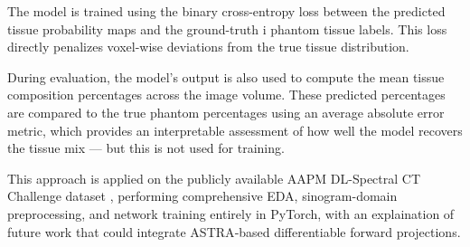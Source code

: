 The model is trained using the binary cross-entropy loss between the predicted tissue probability maps and the ground-truth i
phantom tissue labels. This loss directly penalizes voxel-wise deviations from the true tissue distribution.

During evaluation, the model’s output is also used to compute the mean tissue composition percentages across the image volume. 
These predicted percentages are compared to the true phantom percentages using an average absolute error metric, which provides 
an interpretable assessment of how well the model recovers the tissue mix — but this is not used for training.

This approach is applied on the publicly available AAPM DL-Spectral CT Challenge dataset \cite{AAPM2024SpectralCT},  performing comprehensive
EDA, sinogram-domain preprocessing, and network training entirely in PyTorch, with an explaination of future work that could
integrate ASTRA‐based differentiable forward projections.
